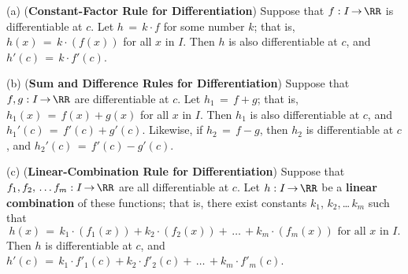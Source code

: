 \V

\hspace*{\parindent}(a) ({\bf Constant-Factor Rule for Differentiation})
Suppose that $f:I \,{\rightarrow}\, {\RR}$ is differentiable at $c$.
    Let $h \,=\, k{\cdot}f$ for some number $k$; that is, $h(x) \,=\, k{\cdot}(f(x))$ for all $x$ in $I$. Then $h$ is also differentiable at $c$, and $h'(c) \,=\, k{\cdot}f'(c)$.

\V

        (b) ({\bf Sum and Difference Rules for Differentiation})
Suppose that $f,g:I \,{\rightarrow}\, {\RR}$ are differentiable at $c$.
    Let $h_{1} \,=\, f+g$; that is, $h_{1}(x) \,=\, f(x)+g(x)$ for all $x$ in $I$. Then $h_{1}$ is also differentiable at $c$, and $h_{1}'(c) \,=\, f'(c)+g'(c)$.
    Likewise, if $h_{2} \,=\, f-g$, then $h_{2}$ is differentiable at $c$, and $h_{2}'(c) \,=\, f'(c)-g'(c)$.

\V

            \label{CorE30.30}%

\V

        (c) ({\bf Linear-Combination Rule for Differentiation})
    Suppose that $f_{1}, f_{2},\,{\ldots}\,f_{m}:I \,{\rightarrow}\, {\RR}$ are all differentiable at $c$. Let $h:I \,{\rightarrow}\, {\RR}$ be a {\bf linear combination} of these functions;
    that is, there exist constants $k_{1}$, $k_{2}$,\,{\ldots}\,$k_{m}$ such that
        \begin{displaymath}
        h(x) \,=\, k_{1}{\cdot}(f_{1}(x)) + k_{2}{\cdot}(f_{2}(x)) + \,{\ldots}\,+ k_{m}{\cdot}(f_{m}(x)) \mbox{ for all $x$ in $I$}.
        \end{displaymath}
    Then $h$ is differentiable at $c$, and
        $h'(c) \,=\, k_{1}{\cdot}f'_{1}(c) + k_{2}{\cdot}f'_{2}(c) + \,{\ldots}\,+ k_{m}{\cdot}f'_{m}(c)$.

\V

